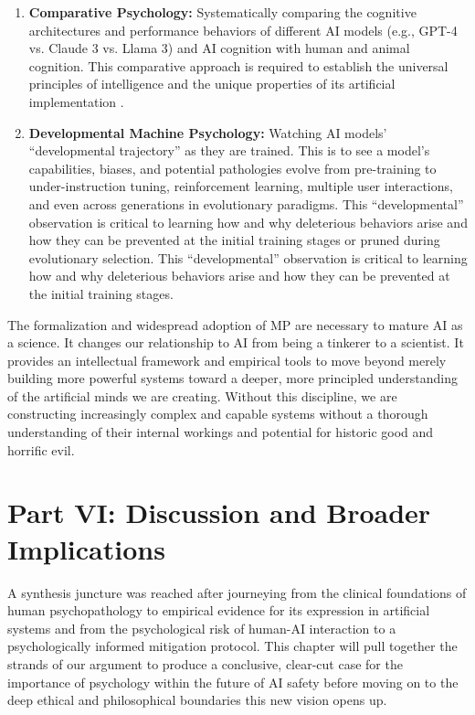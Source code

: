 \documentclass{article}
\begin{document}
\begin{enumerate}
    \item \textbf{Comparative Psychology:} Systematically comparing the cognitive architectures and performance behaviors of different AI models (e.g., GPT-4 vs. Claude 3 vs. Llama 3) and AI cognition with human and animal cognition. This comparative approach is required to establish the universal principles of intelligence and the unique properties of its artificial implementation \citep{ref1}.
    
    \item \textbf{Developmental Machine Psychology:} Watching AI models' “developmental trajectory” as they are trained. This is to see a model's capabilities, biases, and potential pathologies evolve from pre-training to under-instruction tuning, reinforcement learning, multiple user interactions, and even across generations in evolutionary paradigms. This “developmental” observation is critical to learning how and why deleterious behaviors arise and how they can be prevented at the initial training stages or pruned during evolutionary selection. This “developmental” observation is critical to learning how and why deleterious behaviors arise and how they can be prevented at the initial training stages.
\end{enumerate}

The formalization and widespread adoption of MP are necessary to mature AI as a science. It changes our relationship to AI from being a tinkerer to a scientist. It provides an intellectual framework and empirical tools to move beyond merely building more powerful systems toward a deeper, more principled understanding of the artificial minds we are creating. Without this discipline, we are constructing increasingly complex and capable systems without a thorough understanding of their internal workings and potential for historic good and horrific evil.

\section{Part VI: Discussion and Broader Implications}
A synthesis juncture was reached after journeying from the clinical foundations of human psychopathology to empirical evidence for its expression in artificial systems and from the psychological risk of human-AI interaction to a psychologically informed mitigation protocol. This chapter will pull together the strands of our argument to produce a conclusive, clear-cut case for the importance of psychology within the future of AI safety before moving on to the deep ethical and philosophical boundaries this new vision opens up.
\end{document}
